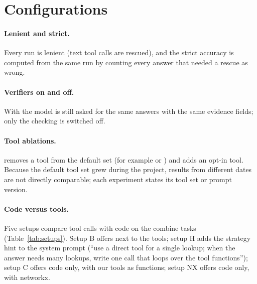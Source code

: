 \section{Configurations}

\paragraph{Lenient and strict.} Every run is lenient (text tool calls are rescued), and the strict accuracy is computed
from the same run by counting every answer that needed a rescue as wrong.

\paragraph{Verifiers on and off.} With  the model is still asked for the same answers with the same
evidence fields; only the checking is switched off.

\paragraph{Tool ablations.}  removes a tool from the default set (for example  or
) and  adds an opt-in tool. Because the default tool set grew during the project,
results from different dates are not directly comparable; each experiment states its tool set or prompt version.

\paragraph{Code versus tools.} Five setups compare tool calls with code on the combine tasks (Table~\ref{tab:setups}).
Setup B offers  next to the tools; setup H adds the strategy hint  to the system
prompt (``use a direct tool for a single lookup; when the answer needs many lookups, write one  call
that loops over the tool functions''); setup C offers code only, with our tools as functions; setup NX offers code
only, with networkx.

